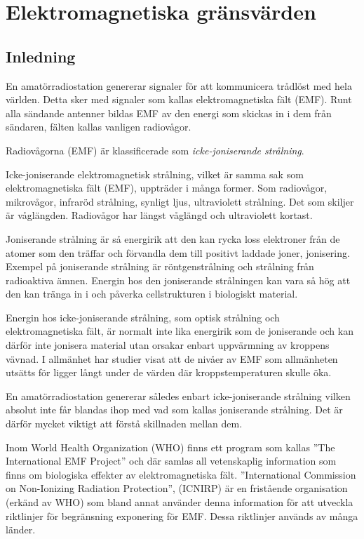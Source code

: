 
\chapter[EMF gränsvärden]{Elektromagnetiska gränsvärden}
\label{EMF}

\section{Inledning}
En amatörradiostation genererar signaler för att kommunicera trådlöst
med hela världen.
Detta sker med signaler som kallas elektromagnetiska fält (EMF).
Runt alla sändande antenner bildas EMF av den energi som skickas in i dem från
sändaren, fälten kallas vanligen radiovågor.

Radiovågorna (EMF) är klassificerade som \emph{icke-joniserande strålning}.

Icke-joniserande elektromagnetisk strålning, vilket är samma sak som
elektromagnetiska fält (EMF), uppträder i många former.
Som radiovågor, mikrovågor, infraröd strålning, synligt ljus, ultraviolett
strålning.
Det som skiljer är våglängden. Radiovågor har längst våglängd och
ultraviolett kortast.

Joniserande strålning är så energirik att den kan rycka loss elektroner från de
atomer som den träffar och förvandla dem till positivt laddade joner,
jonisering.
Exempel på joniserande strålning är röntgenstrålning och strålning från
radioaktiva ämnen.
Energin hos den joniserande strålningen kan vara så hög att den kan
tränga in i och påverka cellstrukturen i biologiskt material.

Energin hos icke-joniserande strålning, som optisk strålning och
elektromagnetiska fält, är normalt inte lika energirik som de joniserande och
kan därför inte jonisera material utan orsakar enbart uppvärmning av kroppens
vävnad.
I allmänhet har studier visat att de nivåer av EMF som allmänheten utsätts för
ligger långt under de värden där kroppstemperaturen skulle öka.

En amatörradiostation genererar således enbart icke-joniserande strålning
vilken absolut inte får blandas ihop med vad som kallas joniserande strålning.
Det är därför mycket viktigt att förstå skillnaden mellan dem.

Inom World Health Organization (WHO) finns ett program som kallas
''The International EMF Project'' och där samlas all vetenskaplig
information som finns om biologiska effekter av elektromagnetiska fält.
''International Commission on Non-Ionizing Radiation Protection'', (ICNIRP)
är en fristående organisation (erkänd av WHO) som bland annat använder denna
information för att utveckla riktlinjer för begränsning exponering för EMF.
Dessa riktlinjer används av många länder.

